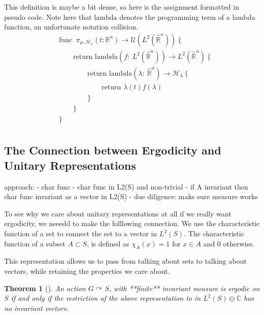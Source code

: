 \documentclass[
]{article}
\newtheorem{thm}{Theorem}
\begin{document}

This definition is maybe a bit dense, so here is the assignment
formatted in pseudo code. Note here that \(\text{lambda}\) denotes the
programming term of a lambda function, an unfortunate notation
collision.
\begin{align*}
& \text{func }\ \pi_{\mu,\mathscr{H}_{\lambda}}(t: \mathbb{R}^n) \rightarrow \mathcal{U}(L^2(\hat{\mathbb{R}}^n)) \ \{ \\
& \qquad \text{return lambda}(f:\ L^2(\hat{\mathbb{R}}^n)) \rightarrow L^2(\hat{\mathbb{R}}^n) \ \{ \\
& \qquad \qquad \text{return lambda}(\lambda:\ \hat{\mathbb{R}}^n) \rightarrow \mathscr{H}_{\lambda} \ \{ \\
& \qquad \qquad \qquad \text{return }\lambda(t)f(\lambda) \\
& \qquad \qquad \} \\
& \qquad \} \\
& \} \\
\end{align*}

\hypertarget{the-connection-between-ergodicity-and-unitary-representations}{%
\subsection{The Connection between Ergodicity and Unitary
Representations}\label{the-connection-between-ergodicity-and-unitary-representations}}

approach: - char func - char func in L2(S) and non-trivial - if A
invariant then char func invariant as a vector in L2(S) - due diligence:
make sure measure works

To see why we care about unitary representations at all if we really
want ergodicity, we neeedd to make the folllowing connection. We use the
characteristic function of a set to connect the set to a vector in
\(L^2(S)\). The characteristic function of a subset \(A\subset S\), is
defined as \(\chi_A(x) = 1\) for \(x \in A\) and \(0\) otherwise.

This representation allows us to pass from talking about sets to talking
about vectors, while retaining the properties we care about.

\begin{thm}[]
  An action $G\curvearrowright S$, with **finite** invariant measure is ergodic
  on $S$ if and only if the restriction of the above representation to  in
  $L^2(S) \ominus \mathbb{C}$ has no invariant vectors.
\end{thm}
  
\end{document}
